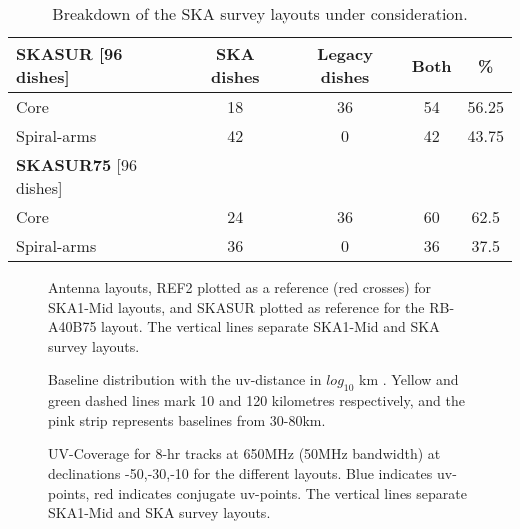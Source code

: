 \documentclass[sfheadings,a4paper,times,9pt,floats,floatfix]{article}
\begin{document}
\begin{table}[H]
\centering
 \tiny{
 \begin{tabular}{l|cccc}\hline
 {\bf SKASUR} [96 dishes] & SKA dishes&  Legacy dishes & Both & \% \\\hline\hline
 Core & 18 & 36 & 54 & 56.25 \\
 Spiral-arms & 42 & 0 & 42 & 43.75 \\\hline\hline
 {\bf SKASUR75} [96 dishes] &  & &  & \\\hline\hline
 Core & 24 & 36 & 60 & 62.5 \\
 Spiral-arms & 36 & 0 & 36 & 37.5 \\\hline\hline
 \end{tabular}}
 \caption{Breakdown of the SKA survey layouts under consideration.}\label{tab:lay}
\end{table}

\begin{figure}[H]
 \tiny{}
 \caption{Antenna layouts, REF2 plotted as a reference (red crosses) for SKA1-Mid layouts, and SKASUR
plotted as reference for the RB-A40B75 layout. The vertical lines separate SKA1-Mid and SKA
survey layouts.}\label{fig:lay}
\end{figure}
\begin{figure}[H]
 \tiny{}
 \caption{Baseline distribution with the uv-distance in $log_{10}$ km . Yellow and green dashed lines mark 10 and 120
kilometres respectively, and the pink strip represents baselines from 30-80km.}\label{fig:hist}
\end{figure}
%  
%  
\begin{figure}[H]
 \tiny{}
 \caption{UV-Coverage for 8-hr tracks at 650MHz (50MHz bandwidth) at declinations -50,-30,-10 for the different layouts. Blue
indicates uv-points, red indicates conjugate uv-points. The vertical lines separate SKA1-Mid and SKA
survey layouts.}\label{fig:uvcov}
\end{figure}
\end{document}
